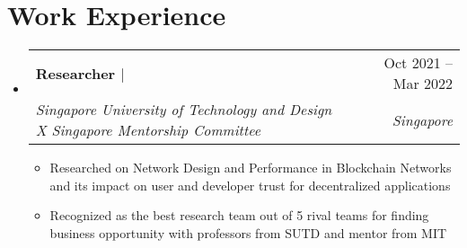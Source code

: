 \documentclass[letterpaper,11pt]{article}
\makeatletter
\newcommand{\resumeItem}[1]{
  \item\small{
    {#1 \vspace{-2.5pt}}
  }
}
\newcommand{\resumeSubheading}[4]{
  \vspace{-2pt}\item
    \begin{tabular*}{0.97\textwidth}[t]{l@{\extracolsep{\fill}}r}
      \textbf{#1} & #2 \\
      \textit{\small#3} & \textit{\small #4} \\
    \end{tabular*}\vspace{-7pt}
}
\newcommand{\resumeSubSubheading}[2]{
    \item
    \begin{tabular*}{0.97\textwidth}{l@{\extracolsep{\fill}}r}
      \textit{\small#1} & \textit{\small #2} \\
    \end{tabular*}\vspace{-7pt}
}
\newcommand{\resumeSubHeadingListStart}{\begin{itemize}[leftmargin=0.15in, label={}]}
\newcommand{\resumeSubHeadingListEnd}{\end{itemize}}
\newcommand{\resumeItemListStart}{\begin{itemize}}
\newcommand{\resumeItemListEnd}{\end{itemize}\vspace{-5pt}}
\makeatother
\begin{document}
\section{Work Experience}
  \resumeSubHeadingListStart
    \resumeSubheading
      {Researcher  $|$ \normalfont {\emph{Solidarity, Blockchain}}}{Oct 2021 -- Mar 2022}
      {Singapore University of Technology and 
      Design X Singapore Mentorship Committee}{Singapore}
      \resumeItemListStart
        \resumeItem{Researched on Network Design and Performance in Blockchain Networks and its impact on user and developer trust for decentralized applications}
        \resumeItem{Recognized as the best research team out of 5 rival teams for finding business opportunity with professors from SUTD and mentor from MIT}
    \resumeItemListEnd
      


    
     

  \resumeSubHeadingListEnd


\end{document}
